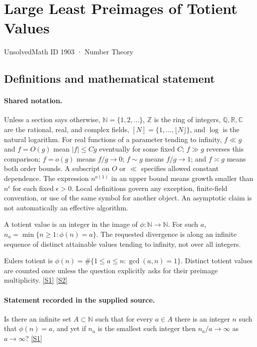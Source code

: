 \documentclass[11pt,a4paper]{article}
\newcommand{\N}{\mathbb{N}}
\newcommand{\Z}{\mathbb{Z}}
\newcommand{\Q}{\mathbb{Q}}
\newcommand{\R}{\mathbb{R}}
\newcommand{\C}{\mathbb{C}}
\newcommand{\sref}[2]{\hyperlink{source:#1:#2}{[S#2]}}
\begin{document}

\setcounter{section}{1902}

\section{Large Least Preimages of Totient Values}\label{1903}

{\small\sffamily UnsolvedMath ID 1903 · Number Theory}

\subsection{Definitions and mathematical statement}

\paragraph{Shared notation.}Unless a section says otherwise, $\N=\{1,2,\ldots\}$,
$\Z$ is the ring of integers, $\Q,\R,\C$ are the rational, real, and complex
fields, $[N]=\{1,\ldots,\lfloor N\rfloor\}$, and $\log$ is the natural
logarithm. For real functions of a parameter tending to infinity,
$f\ll g$ and $f=O(g)$ mean $|f|\leq Cg$ eventually for some fixed $C$;
$f\gg g$ reverses this comparison; $f=o(g)$ means $f/g\to0$;
$f\sim g$ means $f/g\to1$; and $f\asymp g$ means both order bounds.
A subscript on $O$ or $\ll$ specifies allowed constant dependence.
The expression $n^{o(1)}$ in an upper bound means growth smaller than
$n^\epsilon$ for each fixed $\epsilon>0$. Local definitions govern any
exception, finite-field convention, or use of the same symbol for another
object. An asymptotic claim is not automatically an effective algorithm.



A totient value is an integer in the image of $\phi:\N\to\N$. For such $a$, $n_a=\min\{n\geq1:\phi(n)=a\}$. The requested divergence is along an infinite sequence of distinct attainable values tending to infinity, not over all integers.

Euler\textquotesingle s totient is $\phi(n)=\#\{1\leq a\leq n:\gcd(a,n)=1\}$. Distinct totient values are counted once unless the question explicitly asks for their preimage multiplicity. \sref{1903}{1} \sref{1903}{2}

\paragraph{Statement recorded in the supplied source.}
Is there an infinite set $A\subset \mathbb{N}$ such that for every $a\in A$ there is an integer $n$ such that $\phi(n)=a$, and yet if $n_a$ is the smallest such integer then $n_a/a\to \infty$ as $a\to\infty$? \sref{1903}{1}
\end{document}
